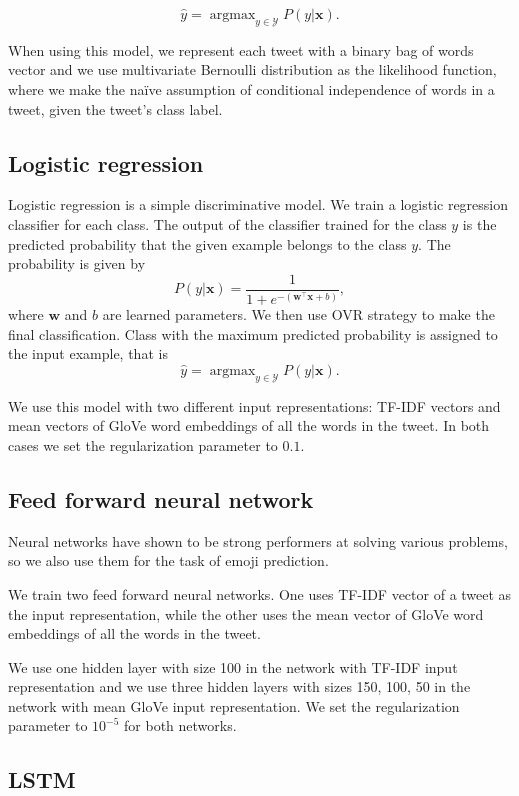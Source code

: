 \documentclass[10pt, a4paper]{article}
\DeclareMathOperator*{\argmax}{argmax}
\begin{document}
$$\hat{y} = \argmax_{y \in \mathcal{Y}} P(y|\mathbf{x}).$$

When using this model, we represent each tweet with a binary bag of words vector
and we use multivariate Bernoulli distribution as the likelihood function, where
we make the na\"{i}ve assumption of conditional independence of words in a 
tweet, given the tweet's class label.

\subsection{Logistic regression}

Logistic regression \citep{murphy2012machine} is a simple discriminative model.
We train a logistic regression classifier for each class. The output of the 
classifier trained for the class $y$ is the predicted probability that the given
example belongs to the class $y$. The probability is given by
$$P(y|\mathbf{x}) = \frac{1}{1 + e^{-(\mathbf{w}^\top \mathbf{x} + b)}},$$
where $\mathbf{w}$ and $b$ are learned parameters. We then use OVR strategy 
\citep{bishop2006pattern} to make the final classification. Class with the 
maximum predicted probability is assigned to the input example, that is 
$$\hat{y} = \argmax_{y \in \mathcal{Y}} P(y|\mathbf{x}).$$

We use this model with two different input representations: TF-IDF vectors and 
mean vectors of GloVe word embeddings of all the words in the tweet. In both 
cases we set the regularization parameter to $0.1$.

\subsection{Feed forward neural network}

Neural networks have shown to be strong performers at solving various problems,
so we also use them for the task of emoji prediction. 

We train two feed forward neural networks. One uses TF-IDF vector of a tweet as 
the input representation, while the other uses the mean vector of GloVe word 
embeddings of all the words in the tweet.

We use one hidden layer with size 100 in the network with TF-IDF input 
representation and we use three hidden layers with sizes 150, 100, 50 in the 
network with mean GloVe input representation. We set the regularization 
parameter to $10^{-5}$ for both networks.

\subsection{LSTM}
\end{document}
